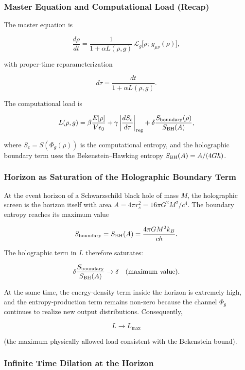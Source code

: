 \documentclass[reprint,amsmath,amssymb,aps,prd,preprintnumbers,superscriptaddress,longbibliography,10pt]{revtex4-2}
\begin{document}
\subsubsection{Master Equation and Computational Load (Recap)}

The master equation is

$$
\frac{d\rho}{dt} = \frac{1}{1 + \alpha L(\rho,g)} \,\mathcal{L}_g\bigl[\rho;\, g_{\mu\nu}(\rho)\bigr],
$$

with proper-time reparameterization

$$
d\tau = \frac{dt}{1 + \alpha L(\rho,g)}.
$$

The computational load is

$$
L(\rho,g) = \beta \frac{E[\rho]}{V \epsilon_0} + \gamma \left| \frac{d S_c}{d\tau} \right|_{\rm reg} + \delta \frac{S_{\rm boundary}(\rho)}{S_{\rm BH}(A)},
$$

where $S_c = S(\Phi_g(\rho))$ is the computational entropy, and the holographic boundary term uses the Bekenstein–Hawking entropy $S_{\rm BH}(A) = A / (4G\hbar)$.

\subsubsection{Horizon as Saturation of the Holographic Boundary Term}

At the event horizon of a Schwarzschild black hole of mass $M$, the holographic screen is the horizon itself with area $A = 4\pi r_s^2 = 16\pi G^2 M^2 / c^4$. The boundary entropy reaches its maximum value

$$
S_{\rm boundary} = S_{\rm BH}(A) = \frac{4\pi G M^2 k_B}{c \hbar}.
$$

The holographic term in $L$ therefore saturates:

$$
\delta \frac{S_{\rm boundary}}{S_{\rm BH}(A)} \to \delta \quad (\text{maximum value}).
$$

At the same time, the energy-density term inside the horizon is extremely high, and the entropy-production term remains non-zero because the channel $\Phi_g$ continues to realize new output distributions. Consequently,

$$
L \to L_{\max}
$$

(the maximum physically allowed load consistent with the Bekenstein bound).

\subsubsection{Infinite Time Dilation at the Horizon}
\end{document}
